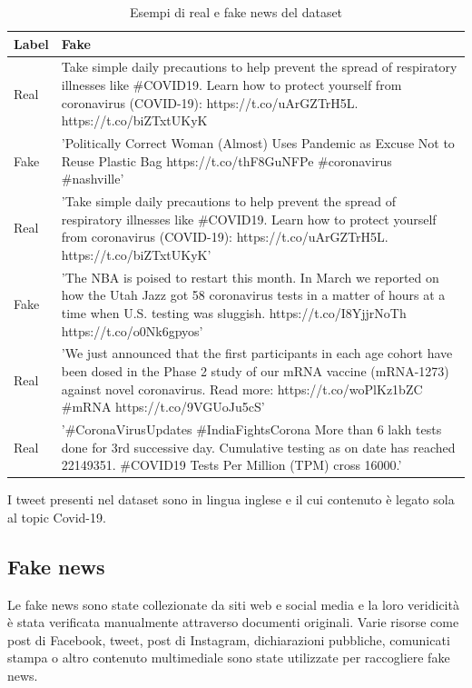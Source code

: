 \documentclass{article}
\begin{document}
\begin{table}[h]
\begin{center}
\begin{tabular}{| l | p{11cm} |}
\hline
\textbf{Label} & \textbf{Fake} \\
\hline
Real & Take simple daily precautions to help prevent the spread of respiratory illnesses like \#COVID19. Learn how to protect yourself from coronavirus (COVID-19): https://t.co/uArGZTrH5L. https://t.co/biZTxtUKyK \\
\hline
Fake & 'Politically Correct Woman (Almost) Uses Pandemic as Excuse Not to Reuse Plastic Bag https://t.co/thF8GuNFPe \#coronavirus \#nashville'  \\
\hline
Real & 'Take simple daily precautions to help prevent the spread of respiratory illnesses like \#COVID19. Learn how to protect yourself from coronavirus (COVID-19): https://t.co/uArGZTrH5L. https://t.co/biZTxtUKyK' \\
\hline
Fake & 'The NBA is poised to restart this month. In March we reported on how the Utah Jazz got 58 coronavirus tests in a matter of hours at a time when U.S. testing was sluggish. https://t.co/I8YjjrNoTh https://t.co/o0Nk6gpyos' \\
\hline
Real & 'We just announced that the first participants in each age cohort have been dosed in the Phase 2 study of our mRNA vaccine (mRNA-1273) against novel coronavirus. Read more: https://t.co/woPlKz1bZC \#mRNA https://t.co/9VGUoJu5cS' \\
\hline
Real & '\#CoronaVirusUpdates \#IndiaFightsCorona More than 6 lakh tests done for 3rd successive day. Cumulative testing as on date has reached 22149351. \#COVID19 Tests Per Million (TPM) cross 16000.' \\
\hline
\end{tabular}
\end{center}
\caption{Esempi di real e fake news del dataset}
\end{table}

\noindent
I tweet presenti nel dataset sono in lingua inglese e il cui contenuto è legato sola al topic Covid-19.

\subsection{Fake news}
Le fake news sono state collezionate da siti web e social media e la loro veridicità è stata verificata manualmente attraverso documenti originali. Varie risorse come post di Facebook, tweet, post di Instagram, dichiarazioni pubbliche, comunicati stampa o altro contenuto multimediale sono state utilizzate per raccogliere fake news.
\end{document}
